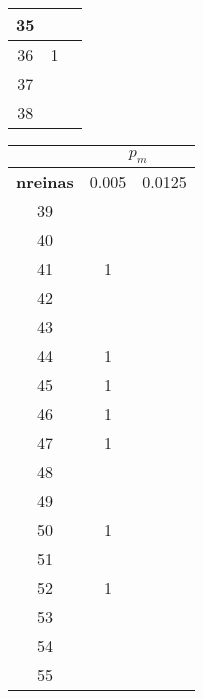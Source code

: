\begin{figure}[H]
\begin{subfigure}{0.3\textwidth}
\begin{adjustbox}{width=\textwidth}
\begin{tabular}{|c|c|c|}
				35&\cellcolor{green!25}{0}&\cellcolor{green!25}{0}\\ \hline
				36& 1 &\cellcolor{green!25}{0}\\ \hline
				37&\cellcolor{green!25}{0}&\cellcolor{green!25}{0}\\ \hline
				38&\cellcolor{green!25}{0}&\cellcolor{green!25}{0}\\ \hline
			\end{tabular}
		\end{adjustbox}
	\end{subfigure}
	\begin{subfigure}{0.3\textwidth}
		\begin{adjustbox}{width=\textwidth} 
			\begin{tabular}{|c|c|c|}
				\hline
				\rowcolor{blue!25} & \multicolumn{2}{c|}{\textbf{$p_m$}} \\ \hline
				\rowcolor{blue!25} \textbf{nreinas} & 0.005 & 0.0125 \\ \hline
				39&\cellcolor{green!25}{0}&\cellcolor{green!25}{0}\\ \hline
				40&\cellcolor{green!25}{0}&\cellcolor{green!25}{0}\\ \hline
				41& 1 &\cellcolor{green!25}{0}\\ \hline
				42&\cellcolor{green!25}{0}&\cellcolor{green!25}{0}\\ \hline
				43&\cellcolor{green!25}{0}&\cellcolor{green!25}{0}\\ \hline
				44& 1 &\cellcolor{green!25}{0}\\ \hline
				45& 1 &\cellcolor{green!25}{0}\\ \hline
				46& 1 &\cellcolor{green!25}{0}\\ \hline
				47& 1 &\cellcolor{green!25}{0}\\ \hline
				48&\cellcolor{green!25}{0}&\cellcolor{green!25}{0}\\ \hline
				49&\cellcolor{green!25}{0}&\cellcolor{green!25}{0}\\ \hline
				50& 1 &\cellcolor{green!25}{0}\\ \hline
				51&\cellcolor{green!25}{0}&\cellcolor{green!25}{0}\\ \hline
				52& 1 &\cellcolor{green!25}{0}\\ \hline
				53&\cellcolor{green!25}{0}&\cellcolor{green!25}{0}\\ \hline
				54&\cellcolor{green!25}{0}&\cellcolor{green!25}{0}\\ \hline
				55&\cellcolor{green!25}{0}&\cellcolor{green!25}{0}\\ \hline

\end{tabular}
\end{adjustbox}
\end{subfigure}
\end{figure}
